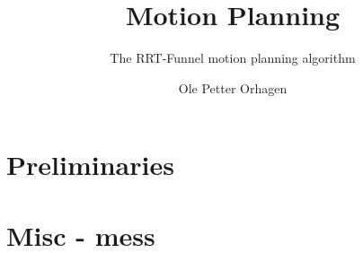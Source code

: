 \documentclass[a4paper, oneside, final, showtrims]{memoir}
\title{Motion Planning}
\author{Ole Petter Orhagen}
\subtitle{The RRT-Funnel motion planning algorithm}
\begin{document}
    \mnfrontpage{}
    \frontmatter        %
    
    
    
    \cleartorecto{}
    \tableofcontents    %
    \cleartorecto{}
    \listoffigures      %
    \cleartorecto{}
    \listoftables       %
    \mainmatter{}       %
    
    
    
    \part{Preliminaries}
    
    
    
    
    \part{Misc - mess}
    \appendix           %
    \appendixpage       %
    
    
    \backmatter         %
    \printbibliography
\end{document}
